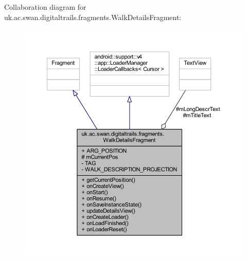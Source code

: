 Collaboration diagram for uk.\+ac.\+swan.\+digitaltrails.\+fragments.\+Walk\+Details\+Fragment\+:
\nopagebreak
\begin{figure}[H]
\begin{center}
\leavevmode
\includegraphics[width=350pt]{classuk_1_1ac_1_1swan_1_1digitaltrails_1_1fragments_1_1_walk_details_fragment__coll__graph}
\end{center}
\end{figure}
